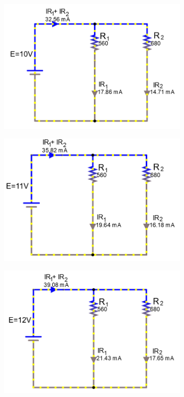 \documentclass[a4paper]{article}
\begin{document}
\begin{figure}[H]
\begin{subfigure}{0.48\textwidth}
\end{subfigure}
\begin{subfigure}{0.48\textwidth}
\includegraphics[width=1.16\linewidth]{amps_10}
\end{subfigure}
\begin{subfigure}{0.48\textwidth}
\includegraphics[width=1.16\linewidth]{amps_11}
\end{subfigure}
\begin{subfigure}{0.48\textwidth}
\includegraphics[width=1.16\linewidth]{amps_12}

\end{subfigure}
\end{figure}
\end{document}
